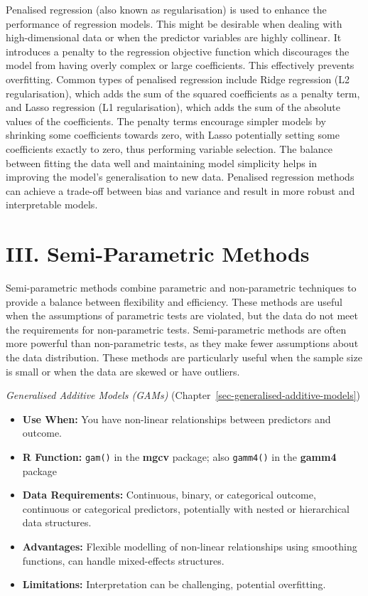 \documentclass[
  letterpaper,
]{book}
\providecommand{\tightlist}{%
  \setlength{\itemsep}{0pt}\setlength{\parskip}{0pt}}\usepackage{longtable,booktabs,array}
\begin{document}
Penalised regression (also known as regularisation) is used to enhance
the performance of regression models. This might be desirable when
dealing with high-dimensional data or when the predictor variables are
highly collinear. It introduces a penalty to the regression objective
function which discourages the model from having overly complex or large
coefficients. This effectively prevents overfitting. Common types of
penalised regression include Ridge regression (L2 regularisation), which
adds the sum of the squared coefficients as a penalty term, and Lasso
regression (L1 regularisation), which adds the sum of the absolute
values of the coefficients. The penalty terms encourage simpler models
by shrinking some coefficients towards zero, with Lasso potentially
setting some coefficients exactly to zero, thus performing variable
selection. The balance between fitting the data well and maintaining
model simplicity helps in improving the model's generalisation to new
data. Penalised regression methods can achieve a trade-off between bias
and variance and result in more robust and interpretable models.

\section{III. Semi-Parametric
Methods}\label{iii.-semi-parametric-methods}

Semi-parametric methods combine parametric and non-parametric techniques
to provide a balance between flexibility and efficiency. These methods
are useful when the assumptions of parametric tests are violated, but
the data do not meet the requirements for non-parametric tests.
Semi-parametric methods are often more powerful than non-parametric
tests, as they make fewer assumptions about the data distribution. These
methods are particularly useful when the sample size is small or when
the data are skewed or have outliers.

\emph{Generalised Additive Models (GAMs)}
(Chapter~\ref{sec-generalised-additive-models})

\begin{itemize}
\tightlist
\item
  \textbf{Use When:} You have non-linear relationships between
  predictors and outcome.
\item
  \textbf{R Function:} \texttt{gam()} in the \textbf{mgcv} package; also
  \texttt{gamm4()} in the \textbf{gamm4} package
\item
  \textbf{Data Requirements:} Continuous, binary, or categorical
  outcome, continuous or categorical predictors, potentially with nested
  or hierarchical data structures.
\item
  \textbf{Advantages:} Flexible modelling of non-linear relationships
  using smoothing functions, can handle mixed-effects structures.
\item
  \textbf{Limitations:} Interpretation can be challenging, potential
  overfitting.
\end{itemize}
\end{document}
